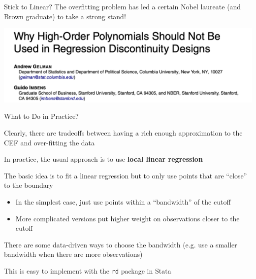 \documentclass[11pt,english,handout]{beamer}
\newenvironment{wideitemize}{\itemize\addtolength{\itemsep}{10pt}}{\enditemize}
\begin{document}
\begin{frame}{Stick to Linear?}
	The overfitting problem has led a certain Nobel laureate (and Brown graduate) to take a strong stand! \vspace{1cm}
	\begin{center}
	\includegraphics[width = 0.7 \linewidth]{gelman-imbens}
	\end{center}
\end{frame}

\begin{frame}{What to Do in Practice?}
	\begin{wideitemize}
		\item
		Clearly, there are tradeoffs between having a rich enough approximation to the CEF and over-fitting the data
		
		\pause
		\item
		In practice, the usual approach is to use \textbf{local linear regression}
		
		\pause
		\item
		The basic idea is to fit a linear regression but to only use points that are ``close'' to the boundary
		
				\pause
				\begin{itemize}
					\item 
					In the simplest case, just use points within a ``bandwidth'' of the cutoff
					
					\pause
					\item
					More complicated versions put higher weight on observations closer to the cutoff
				\end{itemize}
			
		\pause
		\item
		There are some data-driven ways to choose the bandwidth (e.g. use a smaller bandwidth when there are more observations)
		
		\pause
		\item
		This is easy to implement with the \texttt{rd} package in Stata	
	\end{wideitemize}
\end{frame}
\end{document}
